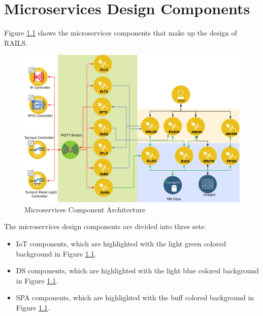 \chapter{Microservices Design Components}
Figure \ref{fig:microarchitecture} shows the microservices components that make up the design of \ac{RAILS}.

\begin{figure}[H]
	\centering
		\includegraphics[scale=0.7]{design.eps}
	\caption{Microservices Component Architecture}
	\label{fig:microarchitecture}
\end{figure}

The microservices design components are divided into three sets:
\begin{itemize}
  \item \ac{IoT} components, which are highlighted with the light green colored background in Figure \ref{fig:microarchitecture}.
  \item \ac{DS} components, which are highlighted with the light blue colored background in Figure \ref{fig:microarchitecture}.
  \item \ac{SPA} components, which are highlighted with the buff colored background in Figure \ref{fig:microarchitecture}.
\end{itemize}

